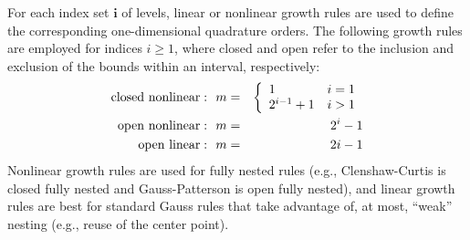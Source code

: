 For each index set $\mathbf{i}$ of levels, linear or nonlinear growth
rules are used to define the corresponding one-dimensional quadrature
orders.  The following growth rules are employed for indices $i \geq
1$, where closed and open refer to the inclusion and exclusion of the
bounds within an interval, respectively:
\begin{eqnarray}
{\rm closed~nonlinear:}~~m &=& 
\left\{ \begin{array}{ll}
         1       & i=1 \\
         2^{i-1} + 1 & i > 1 
        \end{array} \right.    \label{eq:growth_CC_nonlin} \\
{\rm open~nonlinear:}~~m &=& 2^i - 1 \label{eq:growth_Gauss_nonlin} \\
{\rm open~linear:}   ~~m &=& 2 i - 1 \label{eq:growth_Gauss_lin}
\end{eqnarray}
Nonlinear growth rules are used for fully nested rules (e.g.,
Clenshaw-Curtis is closed fully nested and Gauss-Patterson is open
fully nested), and linear growth rules are best for standard Gauss
rules that take advantage of, at most, ``weak'' nesting (e.g., reuse
of the center point).

